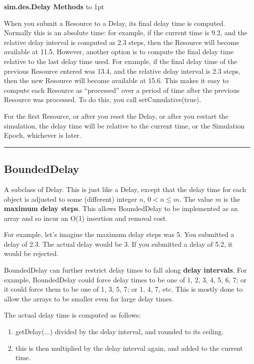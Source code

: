 \documentclass[twoside,10pt]{article}
\newcommand\class[1]{\index{Classes!{#1}}\textsf{#1}}
\newcommand\method[1]{\hbox{\textsf{#1}}}
\newcommand*{\xfill}[1][0pt]{%
	\cleaders
		\hbox to 1pt{\hss
			\raisebox{#1}{\rule{1.2pt}{0.4pt}}%
			\hss}\hfill}
\newenvironment{methods}[1]{
\vspace{1.0em}\noindent\textsf{\textbf{#1 Methods}}\quad \xfill[0.5ex]
\vspace{-0.25em}
\begin{description}
\small}
{\end{description}\hrule\vspace{1.5em}}
\begin{document}
\begin{methods}{\class{sim.des.Delay}}
When you submit a Resource to a Delay, its final delay time is computed.  Normally this is an absolute time: for example, if the current time is 9.2, and the relative delay interval is computed as 2.3 steps, then the Resource will become available at 11.5.  However, another option is to compute the final delay time relative to the last delay time used.   For example, if the final delay time of the previous Resource entered was 13.4, and the relative delay interval is 2.3 steps, then the new Resource will become available at 15.6.  This makes it easy to compute each Resource as ``processed'' over a period of time after the previous Resource was processed.  To do this, you call \method{setCumulative(true)}.  

For the first Resource, or after you reset the Delay, or after you restart
	the simulation, the delay time will be relative to the current time, or the
	Simulation Epoch, whichever is later. 


\end{methods}

\subsection{BoundedDelay}

A subclass of Delay.  This is just like a Delay, except that the delay time for each object is adjusted to some (different) integer \(n\), \(0 < n \leq m\).  The value \(m\) is the {\bf maximum delay steps}.  This allows BoundedDelay to be implemented as an array and so incur an O(1) insertion and removal cost.  

For example, let's imagine the maximum delay steps was 5.  You submitted a delay of 2.3.  The actual delay would be 3.  If you submitted a delay  of 5.2, it would be rejected.

BoundedDelay can further restrict delay times to fall along {\bf delay intervals}.  For example, BoundedDelay could force delay times to be one of 1, 2, 3, 4, 5, 6, 7; or it could force them to be one of 1, 3, 5, 7; or 1, 4, 7, etc.  This is mostly done to allow the arrays to be smaller even for large delay times.  

The actual delay time is computed as follows:
\begin{enumerate}
\item getDelay(...) divided by the delay interval, and rounded to its ceiling.
\item this is then multiplied by the delay interval again, and added to the current time.
\end{enumerate}
\end{document}

